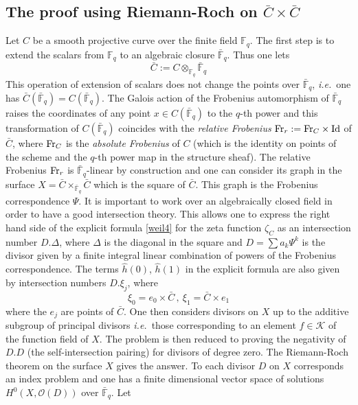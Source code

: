\documentclass[12pt]{article}
\def\id{{\rm id}}
\def\F{{\mathbb F}}
\def\cK{{\mathcal K}}
\def\cO{{\mathcal O}}
\newcommand{\ie}{{\it i.e.\/}\ }
\def\id{{\mbox{Id}}}
\def\fr{{\rm Fr}}
\begin{document}
\subsection{The proof using Riemann-Roch on $\bar C\times \bar C$}\label{rrstrat}

Let  $C$ be  a smooth projective curve  over the finite field $\F_q$. 
The first step is to extend the scalars from $\F_q$ to an algebraic closure $\bar\F_q$. Thus one lets 
\begin{equation}\label{extscal}
\bar C:=C\otimes_{\F_q}\bar\F_q
\end{equation}
This operation of extension of scalars does not change the points over $\bar\F_q$, \ie one has $\bar C(\bar\F_q)=C(\bar\F_q)$. The Galois action of the Frobenius automorphism of $\bar\F_q$ raises the coordinates of any point $x\in C(\bar\F_q)$ to the $q$-th power and this transformation of $C(\bar\F_q)$ coincides with the {\em relative Frobenius} $\fr_r:=\fr_C\times \id$ of $\bar C$, where $\fr_C$ is the {\em absolute Frobenius} of $C$ (which is the identity on points of the scheme and the $q$-th power map in the structure sheaf). The relative Frobenius $\fr_r$ is $\bar\F_q$-linear by construction and one can consider its graph 
in the   surface $X=\bar C\times_{\bar\F_q} \bar C$ which is the square of $\bar C$. This graph is the Frobenius correspondence $\Psi$.   It is important to work over an algebraically closed field in order to have a good intersection theory. 
This allows one to express the right hand side of the explicit formula \eqref{weil4} for the zeta function $\zeta_C$ as an intersection number $D.\Delta$, where $\Delta$ is the diagonal in the square and $D=\sum a_k\Psi^k$ is the divisor given by a  finite integral linear combination of  powers of the Frobenius correspondence. The terms $\hat h (0)$, $\hat h (1)$ in the explicit formula are also given by intersection numbers $D.\xi_j$, where  
\begin{equation}\label{xin}
   \xi_0=e_0\times \bar C\,, \ \xi_1=\bar C\times e_1
\end{equation}
where the $e_j$ are points of $\bar C$. One then  
 considers divisors on $X$  up to
the additive subgroup of principal divisors \ie those corresponding to an element  $f\in \cK$ of the function field of $X$.
 The problem is then reduced to proving the negativity of $D.D$ (the self-intersection pairing) for divisors of degree zero. The Riemann-Roch theorem on the surface $X$ gives the answer. 
 To each divisor $D$ on $X$ corresponds an index problem and one has a finite dimensional vector space of solutions $H^0(X,\cO(D))$ over $\bar\F_q$. Let
\end{document}
